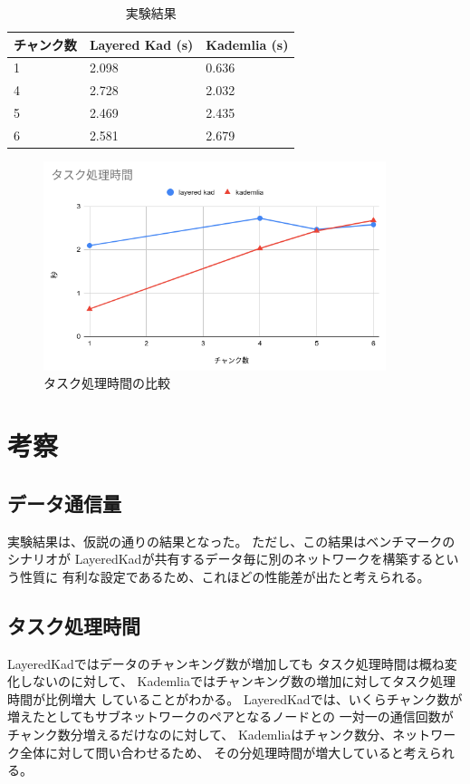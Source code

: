\documentclass[sotsuron]{jcsie}
\begin{document}
\begin{table}[H]
	\caption{実験結果}	
	\centering
	\label{table:calc-result}
	\begin{tabular}{|l|l|l|}
		\hline
		チャンク数 &   
		Layered Kad (s) &   
		Kademlia (s)\\ 
		\hline
		1               &   
		2.098           &   
		0.636\\
		\hline
		4               &   
		2.728           &   
		2.032\\
		\hline
		5               &   
		2.469           &   
		2.435\\
		\hline
		6               &   
		2.581           &   
		2.679\\
		\hline
	\end{tabular}	
\end{table}

\begin{figure}[H]
	\centering
	\includegraphics[width=10cm]{./assets/image/calc_compare.png}
	\caption{タスク処理時間の比較}
	\label{fig:calc_compare.png}
\end{figure}

\chapter{考察}
\section{データ通信量}
実験結果は、仮説の通りの結果となった。
ただし、この結果はベンチマークのシナリオが
LayeredKadが共有するデータ毎に別のネットワークを構築するという性質に
有利な設定であるため、これほどの性能差が出たと考えられる。
\section{タスク処理時間}
LayeredKadではデータのチャンキング数が増加しても
タスク処理時間は概ね変化しないのに対して、
Kademliaではチャンキング数の増加に対してタスク処理時間が比例増大
していることがわかる。
LayeredKadでは、いくらチャンク数が増えたとしてもサブネットワークのペアとなるノードとの
一対一の通信回数がチャンク数分増えるだけなのに対して、
Kademliaはチャンク数分、ネットワーク全体に対して問い合わせるため、
その分処理時間が増大していると考えられる。
\end{document}
